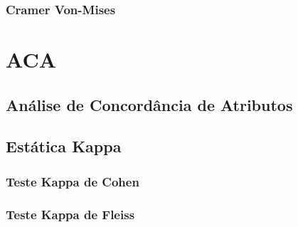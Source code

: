 \documentclass[
]{book}
\begin{document}
\hypertarget{cramer-von-mises}{%
\section{Cramer Von-Mises}\label{cramer-von-mises}}

\hypertarget{part-aca}{%
\part{ACA}\label{part-aca}}

\hypertarget{anuxe1lise-de-concorduxe2ncia-de-atributos}{%
\chapter{Análise de Concordância de Atributos}\label{anuxe1lise-de-concorduxe2ncia-de-atributos}}

\hypertarget{estuxe1tica-kappa}{%
\chapter{Estática Kappa}\label{estuxe1tica-kappa}}

\hypertarget{teste-kappa-de-cohen}{%
\section{Teste Kappa de Cohen}\label{teste-kappa-de-cohen}}

\hypertarget{teste-kappa-de-fleiss}{%
\section{Teste Kappa de Fleiss}\label{teste-kappa-de-fleiss}}

  
\end{document}
